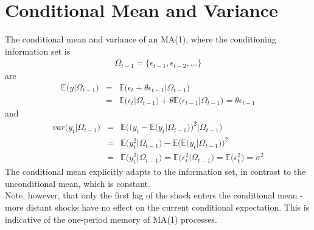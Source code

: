 \section{Conditional Mean and Variance}
The conditional mean and variance of an MA(1), where the conditioning information set is
\begin{eqnarray}
\Omega_{t - 1} = \{\epsilon_{t - 1}, \epsilon_{t - 2}, ...\}
\end{eqnarray}
are
\begin{eqnarray}
	\nonumber
	\mathbb{E}\Big(y\vert\Omega_{t - 1}\Big) &=& \mathbb{E}\Big(\epsilon_{t} + \theta\epsilon_{t - 1}\vert\Omega_{t - 1}\Big)\\
	&=& \mathbb{E}\Big(\epsilon_{t}\vert\Omega_{t - 1}\Big) + \theta\mathbb{E}\Big(\epsilon_{t - 1}\vert\Omega_{t - 1}\Big) = \theta\epsilon_{t - 1}
\end{eqnarray}
and
\begin{eqnarray}
	\nonumber
	var\Big(y_{t}\vert\Omega_{t - 1}\Big) &=& \mathbb{E}\Bigg(\bigg(y_{t} - \mathbb{E}\Big(y_{t}\vert\Omega_{t - 1}\Big)\bigg)^{2}\vert\Omega_{t - 1}\Bigg)\\
	\nonumber
	&=& \mathbb{E}\Big(y_{t}^{2}\vert\Omega_{t - 1}\Big) - \mathbb{E}\bigg(\mathbb{E}\Big(y_{t}\vert\Omega_{t - 1}\Big)\bigg)^{2}\\
	&=&  \mathbb{E}\Big(y_{t}^{2}\vert\Omega_{t - 1}\Big) = \mathbb{E}\Big(\epsilon_{t}^{2}\vert\Omega_{t - 1}\Big) = \mathbb{E}\Big(\epsilon_{t}^{2}\Big) = \sigma^{2}  
\end{eqnarray}
The conditional mean explicitly adapts to the information set, in contrast to the unconditional mean, which is constant.\\
Note, however, that only the first lag of the shock enters the conditional mean - more distant shocks have no effect on the current conditional expectation. This is indicative of the one-period memory of MA(1) processes.

